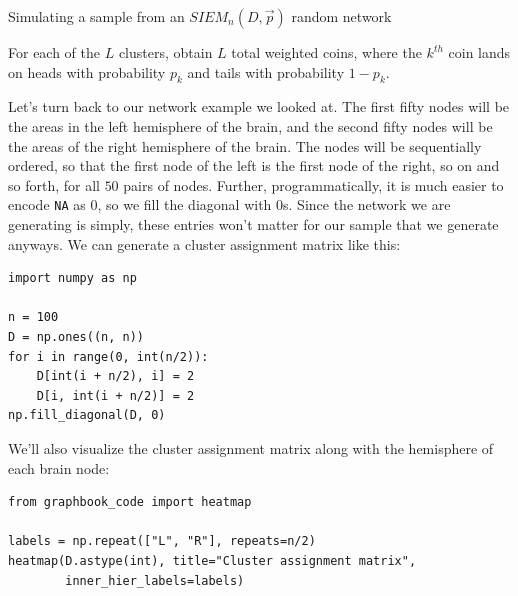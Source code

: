 \begin{algorithm}[h]\caption{Simulating a sample from an $SIEM_n(D, \vec p)$ random network}
\label{alg:ch5:siem}
\SetAlgoLined
{}

For each of the $L$ clusters, obtain $L$ total weighted coins, where the $k^{th}$ coin lands on heads with probability $p_k$ and tails with probability $1 - p_k$.


\end{algorithm}

Let's turn back to our network example we looked at. The first fifty nodes will be the areas in the left hemisphere of the brain, and the second fifty nodes will be the areas of the right hemisphere of the brain. The nodes will be sequentially ordered, so that the first node of the left is the first node of the right, so on and so forth, for all $50$ pairs of nodes. Further, programmatically, it is much easier to encode \texttt{NA} as $0$, so we fill the diagonal with $0$s. Since the network we are generating is simply, these entries won't matter for our sample that we generate anyways. We can generate a cluster assignment matrix like this:

\begin{lstlisting}[style=python]
import numpy as np

n = 100
D = np.ones((n, n))
for i in range(0, int(n/2)):
    D[int(i + n/2), i] = 2
    D[i, int(i + n/2)] = 2
np.fill_diagonal(D, 0)
\end{lstlisting}

We'll also visualize the cluster assignment matrix along with the hemisphere of each brain node:

\begin{lstlisting}[style=python]
from graphbook_code import heatmap

labels = np.repeat(["L", "R"], repeats=n/2)
heatmap(D.astype(int), title="Cluster assignment matrix", 
        inner_hier_labels=labels)
\end{lstlisting}

